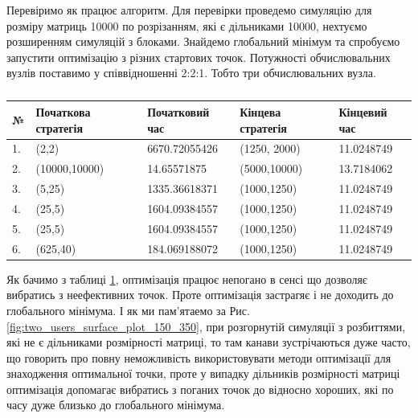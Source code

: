 Перевіримо як працює алгоритм. Для перевірки проведемо симуляцію для розміру матриць 10000 по розрізанням, які є дільниками 10000, нехтуємо розширенням симуляцій з блоками. Знайдемо глобальний мінімум та спробуємо запустити оптимізацію з різних стартових точок. Потужності обчислювальних вузлів поставимо у співвідношенні 2:2:1. Тобто три обчислювальних вузла.

\begin{table}[H]
	\caption{}
	\label{table:optimize_results}
	\begin{tabular}{|l|l|l|l|l|}
		\hline
		№ & Початкова стратегія & Початковий час 	& Кінцева стратегія & Кінцевий час
		\\ \hline
		1.& (2,2)				& 6670.72055426     &(1250, 2000) 		& 11.0248749
		\\ \hline
		2.& (10000,10000)		& 14.65571875   	&  (5000,10000)		& 13.7184062
		\\ \hline
		3.& (5,25)				& 1335.36618371		&  (1000,1250)		& 11.0248749
		\\ \hline
		4.& (25,5)				& 1604.09384557		&  (1000,1250)		& 11.0248749
		\\ \hline
		5.& (25,5)				& 1604.09384557		&  (1000,1250)		& 11.0248749
		\\ \hline
		6.& (625,40)			& 184.069188072		&  (1000,1250)		& 11.0248749
		\\ \hline
		
	\end{tabular}
\end{table}

Як бачимо з таблиці \ref{table:optimize_results}, оптимізація працює непогано в сенсі що дозволяє вибратись з неефективних точок. Проте оптимізація застрагяє і не доходить до глобального мінімума. І як ми пам'ятаемо за Рис. \ref{fig:two_users_surface_plot_150_350}, при розгорнутій симуляції з розбиттями, які не є дільниками розмірності матриці, то там канави зустрічаються дуже часто, що говорить про повну неможливість використовувати методи оптимізації для знаходження оптимальної точки, проте у випадку дільників розмірності матриці оптимізація допомагає вибратись з поганих точок до відносно хороших, які по часу дуже близько до глобального мінімума.








